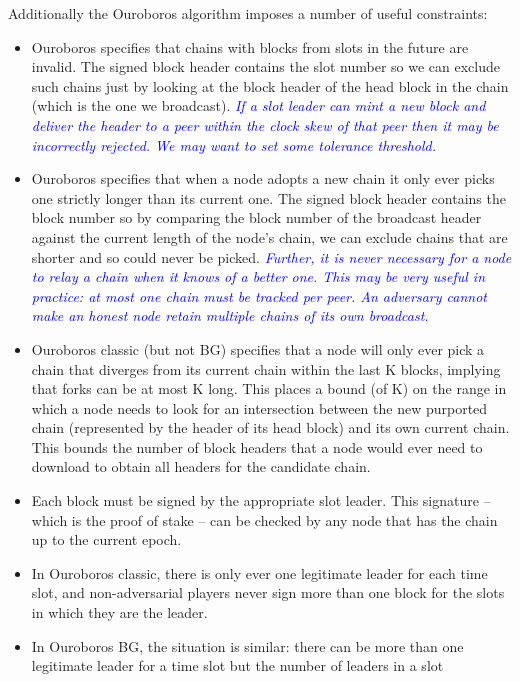 \documentclass{article}
\newcommand{\njd}[1]{\textcolor{purple}{\emph{#1}}}
\newcommand{\avieth}[1]{\textcolor{blue}{\emph{#1}}}
\theoremstyle{definition}{
  \newtheorem{lemma}{Lemma}[section] %
  \newtheorem{definition}[lemma]{Definition}
}
\theoremstyle{theorem}{
  \newtheorem{invariant}[lemma]{Invariant}
  \newtheorem{proofobligation}[lemma]{Proof Obligation}
}
\numberwithin{equation}{lemma}
\begin{document}
Additionally the Ouroboros algorithm imposes a number of useful constraints:
\begin{itemize}
\item Ouroboros specifies that chains with blocks from slots in the future are
      invalid. The signed block header contains the slot number so we can
      exclude such chains just by looking at the block header of the head block
      in the chain (which is the one we broadcast).
      \avieth{If a slot leader can mint a new block and deliver the header to
      a peer within the clock skew of that peer then it may be incorrectly
      rejected. We may want to set some tolerance threshold.}
\item Ouroboros specifies that when a node adopts a new chain it only ever
      picks one strictly longer than its current one. The signed block header
      contains the block number so by comparing the block number of the
      broadcast header against the current length of the node's chain, we can
      exclude chains that are shorter and so could never be picked.
      \avieth{Further, it is never necessary for a node to relay a chain when it
      knows of a better one. This may be very useful in practice: at most one
      chain must be tracked per peer. An adversary cannot make an honest node
      retain multiple chains of its own broadcast.}
\item Ouroboros classic (but not BG\marginpar{\njd{first use - expand}}) specifies that a node will only ever pick
      a chain that diverges from its current chain within the last K blocks,
      implying that forks can be at most K long. This places a bound (of K) on
      the range in which a node needs to look for an intersection between the
      new purported chain (represented by the header of its head block) and its
      own current chain. This bounds the number of block headers that a node
      would ever need to download to obtain all headers for the candidate chain.
\item Each block must be signed by the appropriate slot leader. This signature
      -- which is the proof of stake -- can be checked by any node that has
      the chain up to the current epoch.
\item In Ouroboros classic, there is only ever one legitimate leader for each
      time slot, and non-adversarial players never sign more than one block
      for the slots in which they are the leader.
\item In Ouroboros BG, the situation is similar: there can be more than one
      legitimate leader for a time slot but the number of leaders in a slot

\end{itemize}
\end{document}
